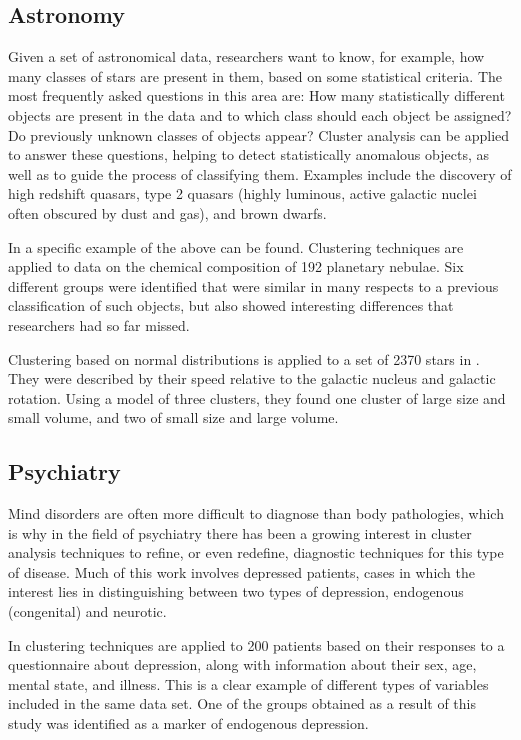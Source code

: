 \subsection{Astronomy}

Given a set of astronomical data, researchers want to know, for example, how many classes of stars are present in them, based on some statistical criteria. The most frequently asked questions in this area are: How many statistically different objects are present in the data and to which class should each object be assigned? Do previously unknown classes of objects appear? Cluster analysis can be applied to answer these questions, helping to detect statistically anomalous objects, as well as to guide the process of classifying them. Examples include the discovery of high redshift quasars, type 2 quasars (highly luminous, active galactic nuclei often obscured by dust and gas), and brown dwarfs.

In \cite{faundez1996classification} a specific example of the above can be found. Clustering techniques are applied to data on the chemical composition of 192 planetary nebulae. Six different groups were identified that were similar in many respects to a previous classification of such objects, but also showed interesting differences that researchers had so far missed.

Clustering based on normal distributions is applied to a set of 2370 stars in \cite{celeux1992classification}. They were described by their speed relative to the galactic nucleus and galactic rotation. Using a model of three clusters, they found one cluster of large size and small volume, and two of small size and large volume.

\subsection{Psychiatry}

Mind disorders are often more difficult to diagnose than body pathologies, which is why in the field of psychiatry there has been a growing interest in cluster analysis techniques to refine, or even redefine, diagnostic techniques for this type of disease. Much of this work involves depressed patients, cases in which the interest lies in distinguishing between two types of depression, endogenous (congenital) and neurotic.

In \cite{pledger2008using} clustering techniques are applied to 200 patients based on their responses to a questionnaire about depression, along with information about their sex, age, mental state, and illness. This is a clear example of different types of variables included in the same data set. One of the groups obtained as a result of this study was identified as a marker of endogenous depression.

